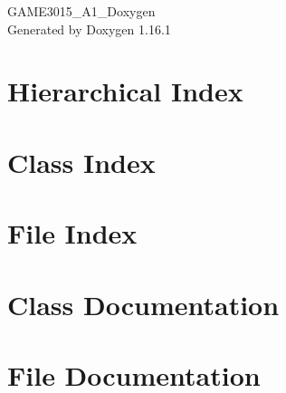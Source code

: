 \documentclass[twoside]{book}
\newcommand{\+}{\discretionary{\mbox{\scriptsize$\hookleftarrow$}}{}{}}
\newcommand{\clearemptydoublepage}{%
    \newpage{\pagestyle{empty}\cleardoublepage}%
  }
\begin{document}
  \raggedbottom
    \hypersetup{pageanchor=false,
                bookmarksnumbered=true,
                pdfencoding=unicode
               }
  \begin{titlepage}
  \vspace*{7cm}
  \begin{center}%
  {\Large GAME3015\+\_\+\+A1\+\_\+\+Doxygen}\\
  \vspace*{1cm}
  {\large Generated by Doxygen 1.16.1}\\
  \end{center}
  \end{titlepage}
  \clearemptydoublepage
  \tableofcontents
  \clearemptydoublepage
  \hypersetup{pageanchor=true}
\chapter{Hierarchical Index}

\chapter{Class Index}

\chapter{File Index}

\chapter{Class Documentation}












\chapter{File Documentation}







  \backmatter
  \newpage
  \clearemptydoublepage
  \printindex
\end{document}
